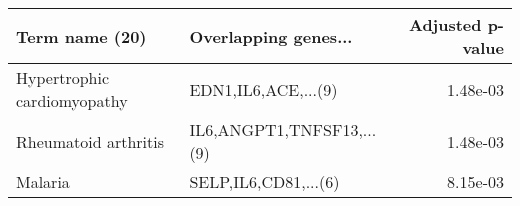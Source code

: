 \begin{tabular}{llr}
\toprule
             Term name (20) &      Overlapping genes... &  Adjusted p-value \\
\midrule
Hypertrophic cardiomyopathy &       EDN1,IL6,ACE,...(9) &          1.48e-03 \\
       Rheumatoid arthritis & IL6,ANGPT1,TNFSF13,...(9) &          1.48e-03 \\
                    Malaria &      SELP,IL6,CD81,...(6) &          8.15e-03 \\
\bottomrule
\end{tabular}
